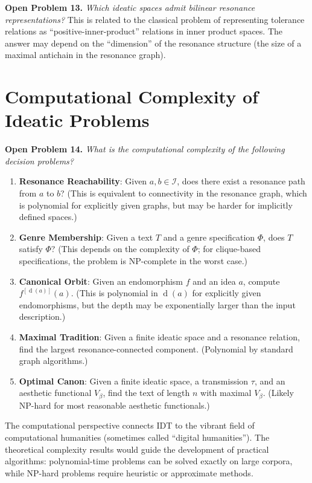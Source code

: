 \documentclass[11pt,openany]{book}
\theoremstyle{definition}
\theoremstyle{plain}
\theoremstyle{remark}
\newcommand{\IS}{\mathcal{I}}               %
\newcommand{\depth}{\operatorname{d}}       %
\newcommand{\transmit}{\tau}                 %
\begin{document}
\textbf{Open Problem 13.} \emph{Which ideatic spaces admit bilinear resonance representations?} This is related to the classical problem of representing tolerance relations as ``positive-inner-product'' relations in inner product spaces. The answer may depend on the ``dimension'' of the resonance structure (the size of a maximal antichain in the resonance graph).

\section{Computational Complexity of Ideatic Problems}

\textbf{Open Problem 14.} \emph{What is the computational complexity of the following decision problems?}
\begin{enumerate}
\item \textbf{Resonance Reachability}: Given $a, b \in \IS$, does there exist a resonance path from $a$ to $b$? (This is equivalent to connectivity in the resonance graph, which is polynomial for explicitly given graphs, but may be harder for implicitly defined spaces.)
\item \textbf{Genre Membership}: Given a text $T$ and a genre specification $\Phi$, does $T$ satisfy $\Phi$? (This depends on the complexity of $\Phi$; for clique-based specifications, the problem is NP-complete in the worst case.)
\item \textbf{Canonical Orbit}: Given an endomorphism $f$ and an idea $a$, compute $f^{[\depth(a)]}(a)$. (This is polynomial in $\depth(a)$ for explicitly given endomorphisms, but the depth may be exponentially larger than the input description.)
\item \textbf{Maximal Tradition}: Given a finite ideatic space and a resonance relation, find the largest resonance-connected component. (Polynomial by standard graph algorithms.)
\item \textbf{Optimal Canon}: Given a finite ideatic space, a transmission $\transmit$, and an aesthetic functional $V_\beta$, find the text of length $n$ with maximal $V_\beta$. (Likely NP-hard for most reasonable aesthetic functionals.)
\end{enumerate}

The computational perspective connects IDT to the vibrant field of computational humanities (sometimes called ``digital humanities''). The theoretical complexity results would guide the development of practical algorithms: polynomial-time problems can be solved exactly on large corpora, while NP-hard problems require heuristic or approximate methods.
\end{document}

